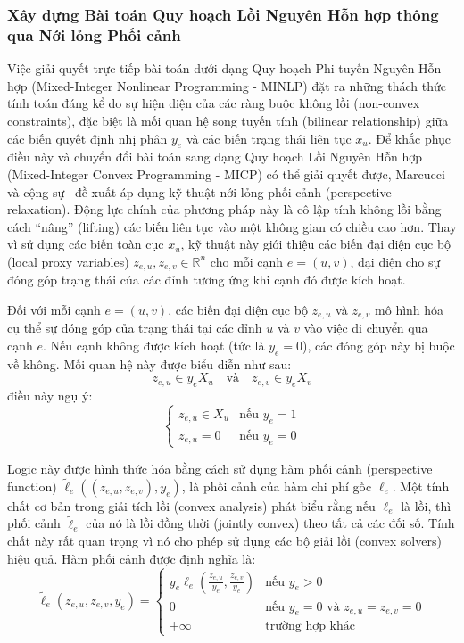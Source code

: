 \subsubsection{Xây dựng Bài toán Quy hoạch Lồi Nguyên Hỗn hợp thông qua Nới lỏng Phối cảnh}

Việc giải quyết trực tiếp bài toán dưới dạng Quy hoạch Phi tuyến Nguyên Hỗn hợp (Mixed-Integer Nonlinear Programming - MINLP) đặt ra những thách thức tính toán đáng kể do sự hiện diện của các ràng buộc không lồi (non-convex constraints), đặc biệt là mối quan hệ song tuyến tính (bilinear relationship) giữa các biến quyết định nhị phân $y_e$ và các biến trạng thái liên tục $x_u$. Để khắc phục điều này và chuyển đổi bài toán sang dạng Quy hoạch Lồi Nguyên Hỗn hợp (Mixed-Integer Convex Programming - MICP) có thể giải quyết được, Marcucci và cộng sự~\cite{MarcucciEtAl2023GCS} đề xuất áp dụng kỹ thuật nới lỏng phối cảnh (perspective relaxation). Động lực chính của phương pháp này là cô lập tính không lồi bằng cách ``nâng'' (lifting) các biến liên tục vào một không gian có chiều cao hơn. Thay vì sử dụng các biến toàn cục $x_u$, kỹ thuật này giới thiệu các biến đại diện cục bộ (local proxy variables) $z_{e,u}, z_{e,v} \in \mathbb{R}^n$ cho mỗi cạnh $e=(u,v)$, đại diện cho sự đóng góp trạng thái của các đỉnh tương ứng khi cạnh đó được kích hoạt.

Đối với mỗi cạnh $e=(u, v)$, các biến đại diện cục bộ $z_{e,u}$ và $z_{e,v}$ mô hình hóa cụ thể sự đóng góp của trạng thái tại các đỉnh $u$ và $v$ vào việc di chuyển qua cạnh $e$. Nếu cạnh không được kích hoạt (tức là $y_e=0$), các đóng góp này bị buộc về không. Mối quan hệ này được biểu diễn như sau:
\[
z_{e,u} \in y_e X_u \quad \text{và} \quad z_{e,v} \in y_e X_v
\]
điều này ngụ ý:
\[\begin{cases}
z_{e,u} \in X_u & \text{nếu } y_e = 1 \\
z_{e,u} = 0 & \text{nếu } y_e = 0
\end{cases}
\]

Logic này được hình thức hóa bằng cách sử dụng hàm phối cảnh (perspective function) $\tilde{\ell}_e((z_{e,u}, z_{e,v}), y_e)$, là phối cảnh của hàm chi phí gốc $\ell_e$. Một tính chất cơ bản trong giải tích lồi (convex analysis) phát biểu rằng nếu $\ell_e$ là lồi, thì phối cảnh $\tilde{\ell}_e$ của nó là lồi đồng thời (jointly convex) theo tất cả các đối số. Tính chất này rất quan trọng vì nó cho phép sử dụng các bộ giải lồi (convex solvers) hiệu quả. Hàm phối cảnh được định nghĩa là:
\[
\tilde{\ell}_e(z_{e,u}, z_{e,v}, y_e) = 
\begin{cases} 
y_e \ell_e\left(\frac{z_{e,u}}{y_e}, \frac{z_{e,v}}{y_e}\right) & \text{nếu } y_e > 0 \\
0 & \text{nếu } y_e = 0 \text{ và } z_{e,u} = z_{e,v} = 0 \\
+\infty & \text{trường hợp khác}
\end{cases}
\]

